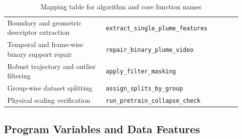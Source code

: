 \begin{table}[!ht]
\begin{tabular}{p{0.4\linewidth} p{0.55\linewidth}}
Boundary and geometric descriptor extraction & \texttt{extract\_single\_plume\_features} \\
Temporal and frame-wise binary support repair & \texttt{repair\_binary\_plume\_video} \\
Robust trajectory and outlier filtering & \texttt{apply\_filter\_masking} \\
Group-wise dataset splitting & \texttt{assign\_splits\_by\_group} \\
Physical scaling verification & \texttt{run\_pretrain\_collapse\_check} \\
\bottomrule
\end{tabular}
\caption{Mapping table for algorithm and core function names}
\end{table}
\FloatBarrier
\clearpage

\subsection{Program Variables and Data Features}


